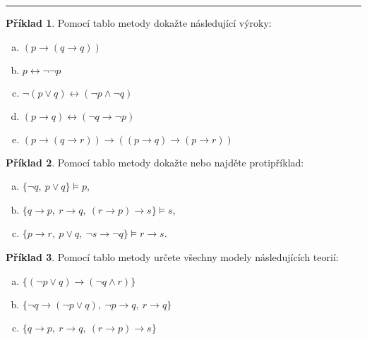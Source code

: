 \documentclass{amsart}
\theoremstyle{definition}
\newtheorem{problem}{Příklad}
\begin{document}
\hrule
\begin{multicols}{2}
\begin{problem}
Pomocí tablo metody dokažte následující výroky:
\begin{enumerate}[(a)]
\item $(p\to (q \to q))$
\item $p \leftrightarrow \neg \neg  p$
\item $\neg (p \vee q) \leftrightarrow (\neg p \wedge \neg q)$
\item $(p \to q) \leftrightarrow (\neg q \to \neg p)$
\item $(p \to (q \to r)) \to ((p\to q)\to (p \to r))$
\end{enumerate}
\end{problem} 

\begin{problem}
Pomocí tablo metody dokažte nebo najděte protipříklad:
\begin{enumerate}[(a)]
\item $\{ \neg q,\ p \vee q\} \models p$,
\item $\{ q \to p,\ r \to q,\ (r \to p) \to s\} \models s$,
\item $\{ p \to r,\ p \vee q,\ \neg s \to \neg q\} \models r \to s$.
\end{enumerate}
\end{problem}

\begin{problem}
Pomocí tablo metody určete všechny modely následujících teorií:
\begin{enumerate}[(a)]
\item $\{(\neg p \vee q) \to (\neg q \wedge r)\}$
\item $\{\neg q \to (\neg p \vee q),\ \neg p \to q,\ r \to q\}$
\item $\{ q \to p,\ r \to q,\ (r \to p) \to s\}$
\end{enumerate}
\end{problem}

\end{multicols}
\end{document}
